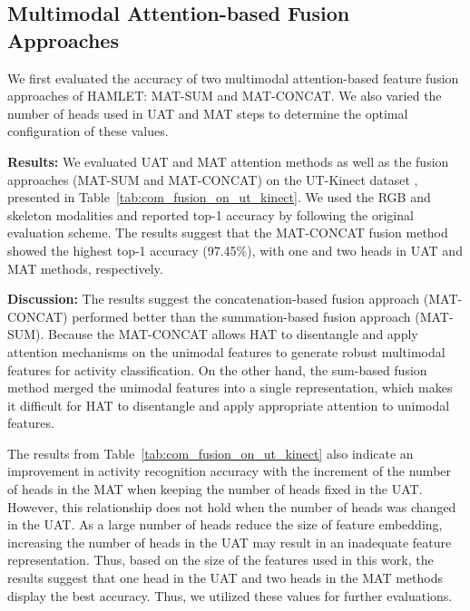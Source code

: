 \documentclass[runningheads]{llncs}
\newcommand{\pa}{HAMLET}
\newcommand{\hattn}{HAT}
\begin{document}
\subsection{Multimodal Attention-based Fusion Approaches}
\label{sec:attention_fusion_approach}

We first evaluated the accuracy of two multimodal attention-based feature fusion approaches of \pa: MAT-SUM and MAT-CONCAT. We also varied the number of heads used in UAT and MAT steps to determine the optimal configuration of these values.


\par \textbf{Results:} We evaluated UAT and MAT attention methods as well as the fusion approaches (MAT-SUM and MAT-CONCAT) on the UT-Kinect dataset \cite{ut_kinect}, presented in Table~\ref{tab:com_fusion_on_ut_kinect}. We used the RGB and skeleton modalities and reported top-1 accuracy by following the original evaluation scheme. The results suggest that the MAT-CONCAT fusion method showed the highest top-1 accuracy (97.45\%), with one and two heads in UAT and MAT methods, respectively.


\par \textbf{Discussion:} The results suggest the concatenation-based fusion approach (MAT-CONCAT) performed better than the summation-based fusion approach (MAT-SUM). Because the MAT-CONCAT allows {\hattn } to disentangle and apply attention mechanisms on the unimodal features to generate robust multimodal features for activity classification. On the other hand, the sum-based fusion method merged the unimodal features into a single representation, which makes it difficult for {\hattn } to disentangle and apply appropriate attention to unimodal features.

\par The results from Table~\ref{tab:com_fusion_on_ut_kinect} also indicate an improvement in activity recognition accuracy with the increment of the number of heads in the MAT when keeping the number of heads fixed in the UAT. However, this relationship does not hold when the number of heads was changed in the UAT. As a large number of heads reduce the size of feature embedding, increasing the number of heads in the UAT may result in an inadequate feature representation. Thus, based on the size of the features used in this work, the results suggest that one head in the UAT and two heads in the MAT methods display the best accuracy. Thus, we utilized these values for further evaluations. 
\end{document}
